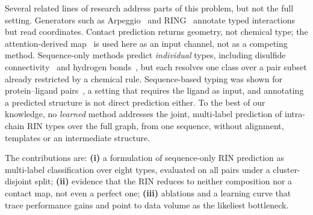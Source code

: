 \documentclass[12pt]{article}
\begin{document}
Several related lines of research address parts of this problem, but not the full setting. Generators such as
Arpeggio~\cite{jubb2017arpeggio} and RING~\cite{delconte2024ring} annotate typed
interactions but read coordinates. Contact prediction returns geometry, not chemical
type; the attention-derived map~\cite{rao2021attention} is used here as an input
channel, not as a competing method. Sequence-only methods predict \emph{individual} types, including
disulfide connectivity~\cite{ceroni2006disulfind} and hydrogen
bonds~\cite{zhou2022mapshb}, but each resolves one class over a pair subset already
restricted by a chemical rule. Sequence-based typing was shown for protein--ligand
pairs~\cite{pham2025linker}, a setting that requires the ligand as input, and annotating
a predicted structure is not direct prediction either. To the best of our knowledge, no \emph{learned}
method addresses the joint, multi-label prediction of intra-chain RIN types over the
full graph, from one sequence, without alignment, templates or an intermediate
structure.

The contributions are: \textbf{(i)} a formulation of sequence-only RIN prediction as
multi-label classification over eight types, evaluated on all pairs under a
cluster-disjoint split; \textbf{(ii)} evidence
that the RIN reduces to neither composition nor a contact map, not even a perfect one;
\textbf{(iii)} ablations and a learning curve that trace performance gains and point to
data volume as the likeliest bottleneck.
\end{document}
